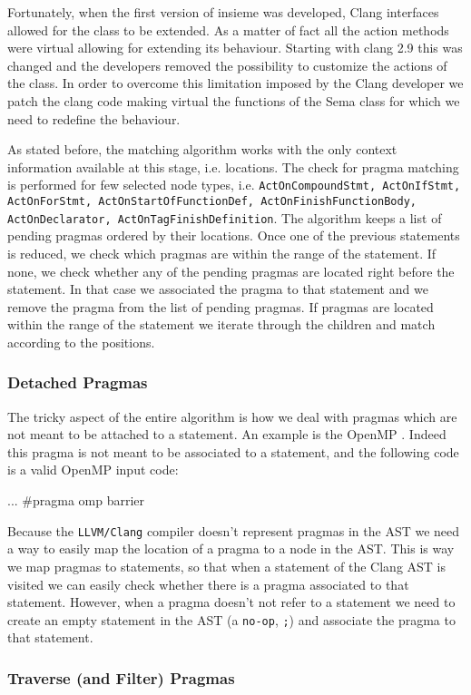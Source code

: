 Fortunately, when the first version of insieme was developed, Clang interfaces
allowed for the class  to be extended. As a matter of fact all
the action methods were virtual allowing for extending its behaviour.
Starting with clang 2.9 this was changed and the developers removed the
possibility to customize the actions of the  class. In order to
overcome this limitation imposed by the Clang developer we patch the clang code
making virtual the functions of the Sema class for which we need to redefine the
behaviour. 

As stated before, the matching algorithm works with the only context information
available at this stage, i.e. locations. The check for pragma matching is
performed for few selected node types, i.e. {\tt ActOnCompoundStmt, ActOnIfStmt,
ActOnForStmt, ActOnStartOfFunctionDef, ActOnFinishFunctionBody, ActOnDeclarator, 
ActOnTagFinishDefinition}. The algorithm keeps a list of pending pragmas ordered
by their locations. Once one of the previous statements is reduced, we check
which pragmas are within the range of the statement. If none, we check whether
any of the pending pragmas are located right before the statement. In that case
we associated the pragma to that statement and we remove the pragma from the
list of pending pragmas. If pragmas are located within the range of the
statement we iterate through the children and match according to the positions.

\subsubsection{Detached Pragmas} 
The tricky aspect of the entire algorithm is how we deal with pragmas which are
not meant to be attached to a statement. An example is the OpenMP . Indeed this pragma is not meant to be associated to a statement,
and the following code is a valid OpenMP input code:

\begin{srcCode}
{
	...
	#pragma omp barrier
}
\end{srcCode}

Because the {\tt LLVM/Clang} compiler doesn't represent pragmas in the AST we
need a way to easily map the location of a pragma to a node in the AST. This is
way we map pragmas to statements, so that when a statement of the Clang AST is
visited we can easily check whether there is a pragma associated to that
statement. However, when a pragma doesn't not refer to a statement we need to
create an empty statement in the AST (a {\tt no-op}, {\tt ;}) and associate the pragma
to that statement. 

\subsubsection{Traverse (and Filter) Pragmas}
